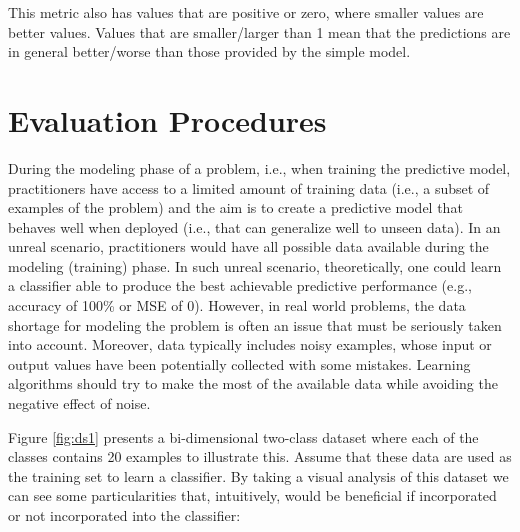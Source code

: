 \noindent This metric also has values that are positive or zero, where smaller values are better values. Values that are smaller/larger than 1 mean that the predictions are in general better/worse than those provided by the simple model.

\section{Evaluation Procedures}
\label{sec:supervised-evaluation-procedures}


During the modeling phase of a problem, i.e., when training the predictive model, practitioners have access to a limited amount of training data (i.e., a subset of examples of the problem) and the aim is to create a predictive model that behaves well when deployed (i.e., that can generalize well to unseen data). %
In an unreal scenario, practitioners would have all possible data available during the modeling (training) phase. In such unreal scenario, theoretically, one could learn a classifier able to produce the best achievable predictive performance (e.g., accuracy of 100\% or MSE of 0). However, in real world problems, the data shortage for modeling the problem is often an issue that must be seriously taken into account. Moreover, data typically includes noisy examples, whose input or output values have been potentially collected with some mistakes. Learning algorithms should try to make the most of the available data while avoiding the negative effect of noise.


Figure \ref{fig:ds1} presents a bi-dimensional two-class dataset where each of the classes contains 20 examples to illustrate this. Assume that these data are used as the training set to learn a classifier. By taking a visual analysis of this dataset we can see some particularities that, intuitively, would be beneficial if incorporated or not incorporated into the classifier:   

